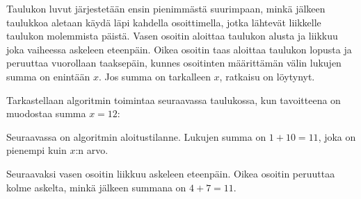 Taulukon luvut järjestetään ensin
pienimmästä suurimpaan, minkä jälkeen
taulukkoa aletaan käydä läpi kahdella osoittimella,
jotka lähtevät liikkelle taulukon molemmista päistä.
Vasen osoitin aloittaa taulukon alusta ja
liikkuu joka vaiheessa askeleen eteenpäin.
Oikea osoitin taas aloittaa taulukon lopusta
ja peruuttaa vuorollaan taaksepäin, kunnes osoitinten
määrittämän välin lukujen summa on enintään $x$.
Jos summa on tarkalleen $x$, ratkaisu on löytynyt.

Tarkastellaan algoritmin toimintaa
seuraavassa taulukossa, kun tavoitteena on muodostaa
summa $x=12$:
\begin{center}
\end{center}

Seuraavassa on algoritmin aloitustilanne.
Lukujen summa on $1+10=11$, joka on pienempi
kuin $x$:n arvo.

\begin{center}
\end{center}

Seuraavaksi vasen osoitin liikkuu askeleen eteenpäin.
Oikea osoitin peruuttaa kolme askelta, minkä jälkeen
summana on $4+7=11$.

